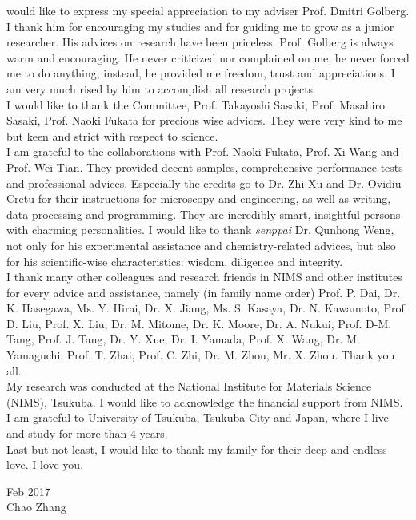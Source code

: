 
 would like to express my special appreciation to my adviser Prof. Dmitri Golberg. I thank him for encouraging my studies and for guiding me to grow as a junior researcher. His advices on research have been priceless. Prof. Golberg is always warm and encouraging. He never criticized nor complained on me, he never forced me to do anything; instead, he provided me freedom, trust and appreciations. I am very much rised by him to accomplish all research projects. \\
I would like to thank the Committee, Prof. Takayoshi Sasaki, Prof. Masahiro Sasaki, Prof. Naoki Fukata for precious wise advices. They were very kind to me but keen and strict with respect to science. \\
I am grateful to the collaborations with Prof. Naoki Fukata, Prof. Xi Wang and Prof. Wei Tian. They provided decent samples, comprehensive performance tests and professional advices. 
Especially the credits go to Dr. Zhi Xu and Dr. Ovidiu Cretu for their instructions for microscopy and engineering, as well as writing, data processing and programming. They are incredibly smart, insightful persons with charming personalities. 
I would like to thank {\em senppai} Dr. Qunhong Weng, not only for his experimental assistance and chemistry-related advices, but also for his scientific-wise characteristics: wisdom, diligence and integrity. \\
I thank many other colleagues and research friends in NIMS and other institutes for every advice and assistance, namely (in family name order) Prof. P. Dai, Dr. K. Hasegawa, Ms. Y. Hirai, Dr. X. Jiang, Ms. S. Kasaya, Dr. N. Kawamoto, Prof. D. Liu, Prof. X. Liu, Dr. M. Mitome, Dr. K. Moore, Dr. A. Nukui, Prof. D-M. Tang, Prof. J. Tang, Dr. Y. Xue, Dr. I. Yamada, Prof. X. Wang, Dr. M. Yamaguchi, Prof. T. Zhai, Prof. C. Zhi, Dr. M. Zhou, Mr. X. Zhou. Thank you all. 
\\
My research was conducted at the National Institute for Materials Science (NIMS), Tsukuba. I would like to acknowledge the financial support from NIMS.\\
I am grateful to University of Tsukuba, Tsukuba City and Japan, where I live and study for more than 4 years. \\
Last but not least, I would like to thank my family for their deep and endless love. I love you. \\[9ex]

\begin{flushright}
Feb 2017\\
Chao Zhang
\end{flushright}

